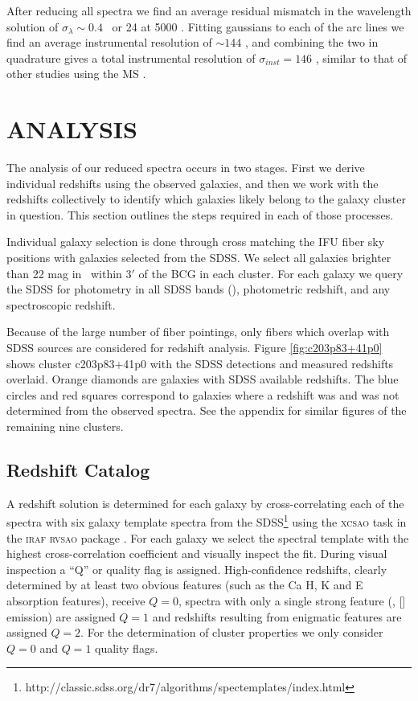 After reducing all spectra we find an average residual mismatch in the wavelength solution of $\sigma_\lambda \sim 0.4$ \AAA\ or 24 \kms at 5000 \AAA. Fitting gaussians to each of the arc lines we find an average instrumental resolution of $\sim144$ \kms, and combining the two in quadrature gives a total instrumental resolution of $\sigma_{inst} = 146$ \kms, similar to that of other studies using the MS .

\section{ANALYSIS}\label{sec:analysis} The analysis of our reduced spectra occurs in two stages. First we derive individual redshifts using the observed galaxies, and then we work with the redshifts collectively to identify which galaxies likely belong to the galaxy cluster in question. This section outlines the steps required in each of those processes. 

Individual galaxy selection is done through cross matching the IFU fiber sky positions with galaxies selected from the SDSS. We select all galaxies brighter than 22 mag in \sdssg\ within $3'$ of the BCG in each cluster. For each galaxy we query the SDSS for photometry in all SDSS bands (\sdssu\sdssg\sdssr\sdssi\sdssz), photometric redshift, and any spectroscopic redshift. 

Because of the large number of fiber pointings, only fibers which overlap with SDSS sources are considered for redshift analysis. Figure \ref{fig:c203p83+41p0} shows cluster c203p83+41p0 with the SDSS detections and measured redshifts overlaid. Orange diamonds are galaxies with SDSS available redshifts. The blue circles and red squares correspond to galaxies where a redshift was and was not determined from the observed spectra. See the appendix for similar figures of the remaining nine clusters.

\subsection{Redshift Catalog}\label{sec:redshift catalog} 
A redshift solution is determined for each galaxy by cross-correlating \citep{Tonry1979} each of the spectra with six galaxy template spectra from the SDSS\footnote{http://classic.sdss.org/dr7/algorithms/spectemplates/index.html} using the \textsc{xcsao} task in the \textsc{iraf} \textsc{rvsao} package \citep{Kurtz1992, Kurtz1998}. For each galaxy we select the spectral template with the highest cross-correlation coefficient and visually inspect the fit. During visual inspection a ``Q'' or quality flag is assigned. High-confidence redshifts, clearly determined by at least two obvious features (such as the Ca H, K and E absorption features), receive $Q=0$, spectra with only a single strong feature (\eg, [] emission) are assigned $Q=1$ and redshifts resulting from enigmatic features are assigned $Q=2$. For the determination of cluster properties we only consider $Q=0$ and $Q=1$ quality flags. 

